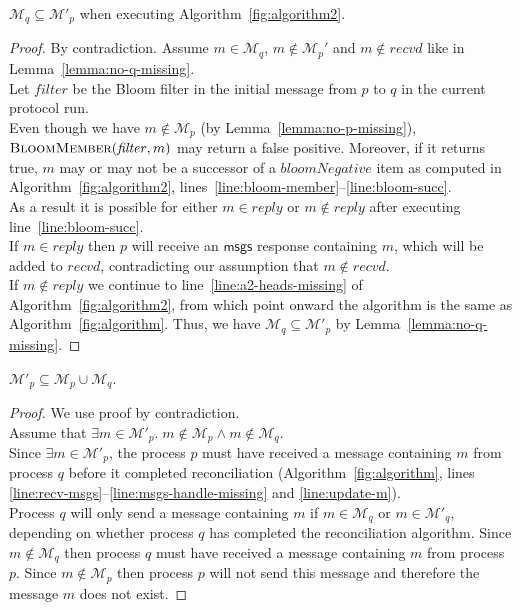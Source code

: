 \documentclass[a4paper,anonymous,USenglish]{lipics-v2019}
\begin{document}
\begin{lemma}\label{lemma:no-q-missing2}
$\mathcal{M}_q \subseteq \mathcal{M}'_p$ when executing Algorithm~\ref{fig:algorithm2}.
\end{lemma}
\begin{proof}
By contradiction.
Assume $m \in \mathcal{M}_q$, $m \notin \mathcal{M}_p'$ and $m \notin \mathit{recvd}$ like in Lemma~\ref{lemma:no-q-missing}.\\
Let $\mathit{filter}$ be the Bloom filter in the initial message from $p$ to $q$ in the current protocol run.\\
Even though we have $m \notin \mathcal{M}_p$ (by Lemma~\ref{lemma:no-p-missing}), $\textsc{BloomMember}(\mathit{filter}, m)$ may return a false positive.
Moreover, if it returns true, $m$ may or may not be a successor of a $\mathit{bloomNegative}$ item as computed in Algorithm~\ref{fig:algorithm2}, lines~\ref{line:bloom-member}--\ref{line:bloom-succ}.\\
As a result it is possible for either $m \in \mathit{reply}$ or $m \notin \mathit{reply}$ after executing line~\ref{line:bloom-succ}.\\
If $m \in \mathit{reply}$ then $p$ will receive an $\mathsf{msgs}$ response containing $m$, which will be added to $\mathit{recvd}$, contradicting our assumption that $m \notin \mathit{recvd}$.\\
If $m \notin \mathit{reply}$ we continue to line~\ref{line:a2-heads-missing} of Algorithm~\ref{fig:algorithm2}, from which point onward the algorithm is the same as Algorithm~\ref{fig:algorithm}.
Thus, we have $\mathcal{M}_q \subseteq \mathcal{M}'_p$ by Lemma~\ref{lemma:no-q-missing}.
\end{proof}

\begin{lemma}\label{lemma:no-extras}
$\mathcal{M}'_p \subseteq \mathcal{M}_p \cup \mathcal{M}_q$.
\end{lemma}
\begin{proof}
We use proof by contradiction.\\
Assume that $\exists m \in \mathcal{M}'_p.\; m \notin \mathcal{M}_p  \land  m \notin \mathcal{M}_q$.\\
Since $\exists m \in \mathcal{M}'_p$, the process $p$ must have received a message containing $m$ from process $q$ before it completed reconciliation (Algorithm~\ref{fig:algorithm}, lines \ref{line:recv-msgs}--\ref{line:msgs-handle-missing} and \ref{line:update-m}).\\
Process $q$ will only send a message containing $m$ if $m \in \mathcal{M}_q$ or $m \in \mathcal{M}'_q$, depending on whether process $q$ has completed the reconciliation algorithm.
Since $m \notin \mathcal{M}_q$ then process $q$ must have received a message containing $m$ from process $p$.
Since $m \notin \mathcal{M}_p$ then process $p$ will not send this message and therefore the message $m$ does not exist.
\end{proof}
\end{document}
